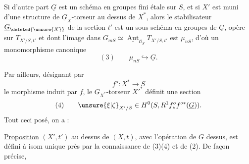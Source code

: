 
Si d'autre part $\underline G$ est un schéma en groupes fini étale sur $S$, et si $X'$ est muni d'une structure de $\underline G_X$-torseur au dessus de $X^*$, alors le stabilisateur  $\underline G_{\deleted{\unsure{X}}}$ de la section $t'$ est un sous-schéma en groupes  de $\underline G$,   opère  sur  $T_{X'/S,t'}$ et dont l'image dans  $G_{mS}\simeq\underline{\operatorname{Aut}}_{\mathcal O_S}T_{X'/S,t'}$ est $\mu_{nS}$, d'où un monomorphisme canonique
\[
(3)\qquad \mu_{nS}\hookrightarrow\underline G.
\]

Par ailleurs, désignant par
\[
f^o:X^*\longrightarrow S
\]
le morphisme induit par $f$, le $\underline G_{X^*}$-torseur $X'^*$ définit une section
\[
(4)\qquad \unsure{\xi|\zeta}_{X'/S}\in H^0(S,R^1f^o_*f^{o*}(\underline G)).
\]
Tout ceci posé, on a :

\uline{Proposition} $(X',t')$ au dessus de $(X,t)$, avec l'opération de $\underline G$ dessus, est défini à isom unique près par la connaissance de (3)(4) et de (2).  De façon précise,
